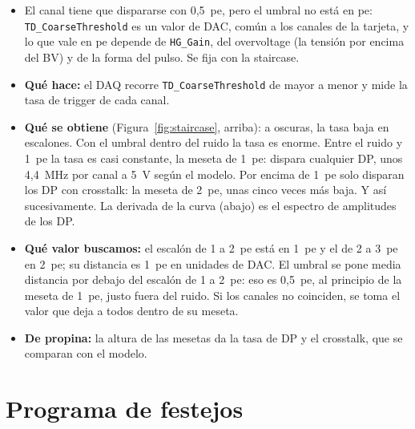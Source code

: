 \documentclass[11pt,a4paper]{article}
\begin{document}
\begin{itemize}
\item El canal tiene que dispararse con 0,5~pe, pero el umbral no está en
  pe: \texttt{TD\_CoarseThreshold} es un valor de DAC, común a los canales
  de la tarjeta, y lo que vale en pe depende de \texttt{HG\_Gain}, del
  overvoltage (la tensión por encima del BV) y de la forma del pulso. Se
  fija con la staircase.
\item {\bf Qué hace:} el DAQ recorre \texttt{TD\_CoarseThreshold} de mayor a
  menor y mide la tasa de trigger de cada canal.
\item {\bf Qué se obtiene} (Figura~\ref{fig:staircase}, arriba): a oscuras,
  la tasa baja en escalones. Con el umbral dentro del ruido la tasa es
  enorme. Entre el ruido y 1~pe la tasa es casi constante, la meseta de
  1~pe: dispara cualquier DP, unos 4,4~MHz por canal a 5~V según el modelo.
  Por encima de 1~pe solo disparan los DP con crosstalk: la meseta de 2~pe,
  unas cinco veces más baja. Y así sucesivamente. La derivada de la curva
  (abajo) es el espectro de amplitudes de los DP.
\item {\bf Qué valor buscamos:} el escalón de 1 a 2~pe está en 1~pe y el de
  2 a 3~pe en 2~pe; su distancia es 1~pe en unidades de DAC. El umbral se
  pone media distancia por debajo del escalón de 1 a 2~pe: eso es 0,5~pe, al
  principio de la meseta de 1~pe, justo fuera del ruido. Si los canales no
  coinciden, se toma el valor que deja a todos dentro de su meseta.
\item {\bf De propina:} la altura de las mesetas da la tasa de DP y el
  crosstalk, que se comparan con el modelo.
\end{itemize}

\section*{Programa de festejos}
\end{document}
